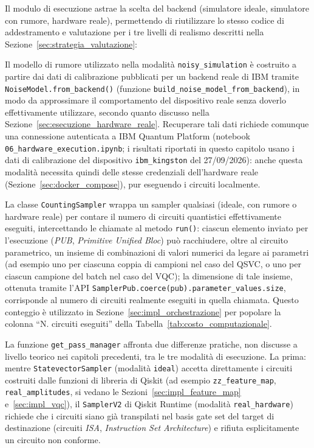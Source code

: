Il modulo di esecuzione astrae la scelta del backend (simulatore ideale, simulatore con rumore, hardware reale), permettendo di riutilizzare lo stesso codice di addestramento e valutazione per i tre livelli di realismo descritti nella Sezione~\ref{sec:strategia_valutazione}:



Il modello di rumore utilizzato nella modalità \texttt{noisy\_simulation} è costruito a partire dai dati di calibrazione pubblicati per un backend reale di IBM tramite \texttt{NoiseModel.from\_backend()} (funzione \texttt{build\_noise\_model\_from\_backend}), in modo da approssimare il comportamento del dispositivo reale senza doverlo effettivamente utilizzare, secondo quanto discusso nella Sezione~\ref{sec:esecuzione_hardware_reale}. Recuperare tali dati richiede comunque una connessione autenticata a IBM Quantum Platform (notebook \texttt{06\_hardware\_execution.ipynb}; i risultati riportati in questo capitolo usano i dati di calibrazione del dispositivo \texttt{ibm\_kingston} del 27/09/2026): anche questa modalità necessita quindi delle stesse credenziali dell'hardware reale (Sezione~\ref{sec:docker_compose}), pur eseguendo i circuiti localmente.

La classe \texttt{CountingSampler} wrappa un sampler qualsiasi (ideale, con rumore o hardware reale) per contare il numero di circuiti quantistici effettivamente eseguiti, intercettando le chiamate al metodo \texttt{run()}: ciascun elemento inviato per l'esecuzione (\textit{PUB}, \textit{Primitive Unified Bloc}) può racchiudere, oltre al circuito parametrico, un insieme di combinazioni di valori numerici da legare ai parametri (ad esempio uno per ciascuna coppia di campioni nel caso del QSVC, o uno per ciascun campione del batch nel caso del VQC); la dimensione di tale insieme, ottenuta tramite l'API \texttt{SamplerPub.coerce(pub).parameter\_values.size}, corrisponde al numero di circuiti realmente eseguiti in quella chiamata. Questo conteggio è utilizzato in Sezione~\ref{sec:impl_orchestrazione} per popolare la colonna ``N. circuiti eseguiti'' della Tabella~\ref{tab:costo_computazionale}.

La funzione \texttt{get\_pass\_manager} affronta due differenze pratiche, non discusse a livello teorico nei capitoli precedenti, tra le tre modalità di esecuzione. La prima: mentre \texttt{StatevectorSampler} (modalità \texttt{ideal}) accetta direttamente i circuiti costruiti dalle funzioni di libreria di Qiskit (ad esempio \texttt{zz\_feature\_map}, \texttt{real\_amplitudes}, si vedano le Sezioni~\ref{sec:impl_feature_map} e~\ref{sec:impl_vqc}), il \texttt{SamplerV2} di Qiskit Runtime (modalità \texttt{real\_hardware}) richiede che i circuiti siano già transpilati nel basis gate set del target di destinazione (circuiti \textit{ISA}, \textit{Instruction Set Architecture}) e rifiuta esplicitamente un circuito non conforme.

